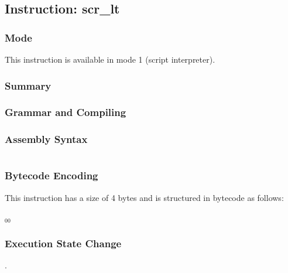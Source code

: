 \subsection{Instruction: scr\_lt}

\subsubsection{Mode}
This instruction is available in mode 1 (script interpreter).
\subsubsection{Summary}


\subsubsection{Grammar and Compiling}


\subsubsection{Assembly Syntax}

\begin{myquote}
\begin{verbatim}

\end{verbatim}
\end{myquote}

\subsubsection{Bytecode Encoding}

This instruction has a size of 4 bytes and is structured in bytecode as follows:

$_{00}$\ 

\subsubsection{Execution State Change}

.



